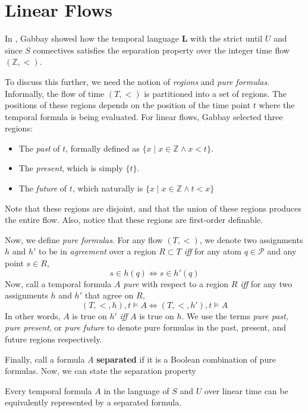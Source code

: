 \documentclass[a4paper,UKenglish,cleveref, autoref, thm-restate]{lipics-v2021}
\begin{document}
\section{Linear Flows}

In \cite{gabbay1994}, Gabbay showed how the temporal language $\mathbf{L}$ with the strict until $U$ and since $S$ connectives satisfies the separation property over the integer time flow $(\mathbb{Z}, <)$.

To discuss this further, we need the notion of \textit{regions} and \textit{pure formulas}. Informally, the flow of time $(T, <)$ is partitioned into a set of regions. The positions of these regions depends on the position of the time point $t$ where the temporal formula is being evaluated. For linear flows, Gabbay selected three regions:
\begin{itemize}
    \item The \textit{past} of $t$, formally defined as $\{ x \mid x \in \mathbb{Z} \land x < t\}$.
    \item The \textit{present}, which is simply $\{ t \}$.
    \item The \textit{future} of $t$, which naturally is $\{x \mid x \in \mathbb{Z} \land t < x\}$
\end{itemize}
Note that these regions are disjoint, and that the union of these regions produces the entire flow. Also, notice that these regions are first-order definable.

Now, we define \textit{pure formulas}. For any flow $(T, <)$, we denote two assignments $h$ and $h'$ to be in \textit{agreement} over a region $R \subset T$ \textit{iff} for any atom $q \in \mathcal{P}$ and any point $s \in R$,
\begin{equation*}
    s \in h(q) \Longleftrightarrow s \in h'(q)
\end{equation*}
Now, call a temporal formula $A$ \textit{pure} with respect to a region $R$ \textit{iff} for any two assignments $h$ and $h'$ that agree on $R$,
\begin{equation*}
    (T, <, h), t \vDash A \Longleftrightarrow (T, <, h'), t \vDash A
\end{equation*}
In other words, $A$ is true on $h'$ \textit{iff} $A$ is true on $h$. We use the terms \textit{pure past}, \textit{pure present}, or \textit{pure future} to denote pure formulas in the past, present, and future regions respectively.

Finally, call a formula $A$ \textbf{separated} if it is a Boolean combination of pure formulas. Now, we can state the separation property
\begin{theorem}
    \label{separation-theorem-linear-time}
    Every temporal formula $A$ in the language of $S$ and $U$ over linear time can be equivalently represented by a separated formula.
\end{theorem}
\end{document}
